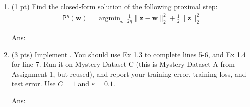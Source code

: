 \documentclass[10pt,letter,notitlepage]{article}
\newcommand{\argmin}{\mathop{\mathrm{argmin}}}
\newcommand{\wv}{\mathbf{w}}
\newcommand{\zv}{\mathbf{z}}
\newcommand{\ans}[1]{{\color{orange}\textsf{Ans}: #1}}
\newcounter{exercise}
\begin{document}
\begin{exercise}
\begin{enumerate}
	
\ans{} 

	
\item (1 pt) Find the closed-form solution of the following proximal step:
	\begin{align}
	\mathsf{P}^\eta(\wv) = \argmin_{\zv} ~ \frac{1}{2\eta} \|\zv - \wv\|_2^2 + \frac{1}{2} \|\zv\|_2^2
	\end{align}
	
	
\ans{} 

	
\item (3 pts) Implement . You should use Ex 1.3 to complete lines 5-6, and Ex 1.4 for line 7. 
Run it on Mystery Dataset C (this is Mystery Dataset A from Assignment 1, but reused), and report your training error, training loss, and test error. Use $C=1$ and $\varepsilon = 0.1$.

\ans{} 

\end{enumerate}
\end{exercise}
\end{document}
